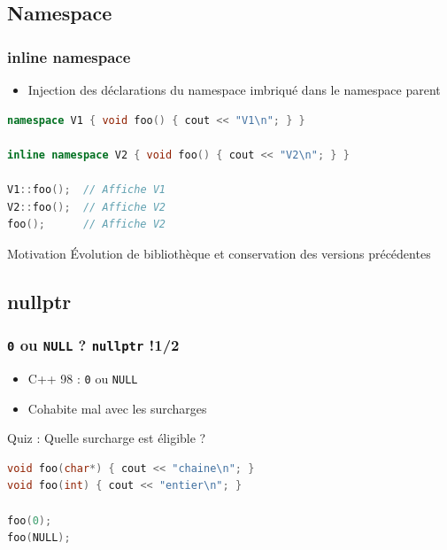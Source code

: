 \documentclass[C++.tex]{subfiles}
\begin{document}
\subsection*{Namespace}
\begin{frame}[fragile]
	\frametitle{inline namespace}
	\begin{itemize}
		\item Injection des déclarations du namespace imbriqué dans le namespace parent
	\end{itemize}

	\begin{lstlisting}[language=C++]
namespace V1 { void foo() { cout << "V1\n"; } }

inline namespace V2 { void foo() { cout << "V2\n"; } }

V1::foo();  // Affiche V1
V2::foo();  // Affiche V2
foo();      // Affiche V2\end{lstlisting}

	\begin{block}{Motivation}
		Évolution de bibliothèque et conservation des versions précédentes
	\end{block}
\end{frame}

\subsection*{nullptr}
\begin{frame}[fragile]
	\frametitle{\lstinline|0| ou \lstinline|NULL| ? \lstinline|nullptr| !\titlehfill{}1/2}
	\begin{itemize}
		\item C++ 98 : \lstinline|0| ou \lstinline|NULL|


		\item Cohabite mal avec les surcharges
	\end{itemize}

	\begin{block}{Quiz : Quelle surcharge est éligible ?}
		\begin{lstlisting}[language=C++]
void foo(char*) { cout << "chaine\n"; }
void foo(int) { cout << "entier\n"; }

foo(0);
foo(NULL);\end{lstlisting}
	\end{block}


\end{frame}
\end{document}
